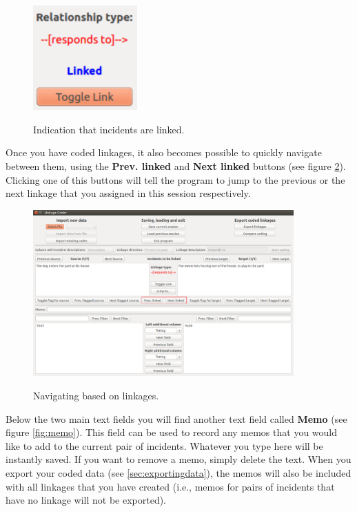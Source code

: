 \documentclass{memoir}
\begin{document}
\begin{figure}[h!]
  \centering
  \caption{Indication that incidents are linked.}
  \includegraphics[width=40mm]{Screenshot_10.pdf}
  \label{fig:linkage}
\end{figure}

Once you have coded linkages, it also becomes possible to quickly navigate between them, using the \textbf{Prev. linked} and \textbf{Next linked} buttons (see figure \ref{fig:linkedbuttons}). Clicking one of this buttons will tell the program to jump to the previous or the next linkage that you assigned in this session respectively.

\begin{figure}[h!]
  \centering
  \caption{Navigating based on linkages.}
  \includegraphics[width=100mm]{Screenshot_21.pdf}
  \label{fig:linkedbuttons}
\end{figure}


Below the two main text fields you will find another text field called \textbf{Memo} (see figure \ref{fig:memo}). This field can be used to record any memos that you would like to add to the current pair of incidents. Whatever you type here will be instantly saved. If you want to remove a memo, simply delete the text. When you export your coded data (see \ref{sec:exportingdata}), the memos will also be included with all linkages that you have created (i.e., memos for pairs of incidents that have no linkage will not be exported). 
\end{document}
